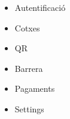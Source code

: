 \begin{slide}
    \begin{itemize}
        \item Autentificació
        \item Cotxes
        \item QR
        \item Barrera
        \item Pagaments
        \item Settings
    \end{itemize}
\end{slide}




